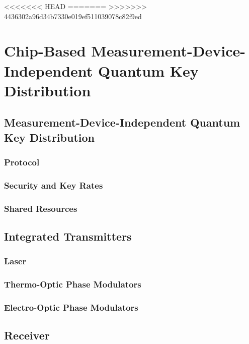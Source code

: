 %
%
<<<<<<< HEAD
\glsresetall
=======
\acresetall
>>>>>>> 4436302a96d34b7330e019ef511039078c82f9ed
\graphicspath{{./chapters/chapter04/fig04/}}

\let\textcircled=\pgftextcircled
\chapter{Chip-Based Measurement-Device-Independent Quantum Key Distribution}
\label{chap:mdiqkd}

\section{Measurement-Device-Independent Quantum Key Distribution}
\label{sec:mdi-qkd}

\subsection{Protocol}

\subsection{Security and Key Rates}

\subsection{Shared Resources}

\section{Integrated Transmitters}

\subsection{Laser}

\subsection{Thermo-Optic Phase Modulators}

\subsection{Electro-Optic Phase Modulators}

\section{Receiver}

